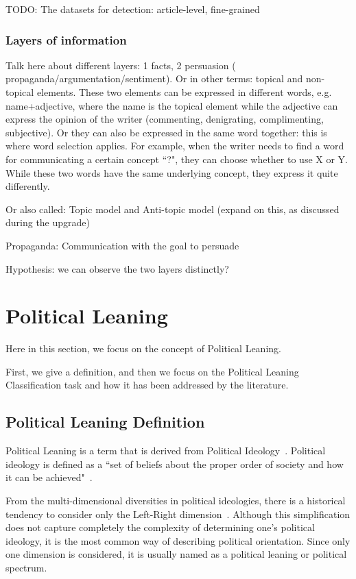 TODO: The datasets for detection: article-level, fine-grained

\subsubsection{Layers of information}
\label{ssec:lit_layers_of_info}

Talk here about different layers: 1 facts, 2 persuasion ( propaganda/argumentation/sentiment). Or in other terms: topical and non-topical elements.
These two elements can be expressed in different words, e.g. name+adjective, where the name is the topical element while the adjective can express the opinion of the writer (commenting, denigrating, complimenting, subjective).
Or they can also be expressed in the same word together: this is where word selection applies. For example, when the writer needs to find a word for communicating a certain concept ``?", they can choose whether to use X or Y. While these two words have the same underlying concept, they express it quite differently.

Or also called: Topic model and Anti-topic model (expand on this, as discussed during the upgrade)

Propaganda: Communication with the goal to persuade

Hypothesis: we can observe the two layers distinctly?

\section{Political Leaning}
\label{sec:lit_leaning}

Here in this section, we focus on the concept of Political Leaning.

First, we give a definition, and then we focus on the Political Leaning Classification task and how it has been addressed by the literature.

\subsection{Political Leaning Definition}

Political Leaning is a term that is derived from Political Ideology~\citep{jost2009political}.
Political ideology is defined as a ``set of beliefs about the proper order of society and how it can be achieved"~\citep[p.~64]{erikson2015american}.

From the multi-dimensional diversities in political ideologies, there is a historical tendency to consider only the Left-Right dimension~\citep{jost2009political}.
Although this simplification does not capture completely the complexity of determining one's political ideology, it is the most common way of describing political orientation.
Since only one dimension is considered, it is usually named as a political leaning or political spectrum.

